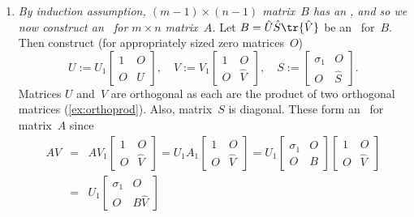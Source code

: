 \begin{enumerate}
\item \emph{By induction assumption, \((m-1)\times(n-1)\) matrix~\(B\) has an \svd, and so we now construct an \svd\ for \(m\times n\) matrix~\(A\).}
Let \(B=\hat U\hat S\tr{\hat V}\) be an \svd\ for~\(B\).
Then construct (for appropriately sized zero matrices~\(O\))
\begin{equation*}
U:=U_1\begin{bmatrix} 1&O\\O&\hat U \end{bmatrix},\quad
V:=V_1\begin{bmatrix} 1&O\\O&\hat V\end{bmatrix},\quad
S:=\begin{bmatrix} \sigma_1&O\\O&\hat S \end{bmatrix}.
\end{equation*}
Matrices \(U\) and~\(V\) are orthogonal as each are the product of two orthogonal matrices (\cref{ex:orthoprod}).
Also, matrix~\(S\) is diagonal.
These form an \svd\ for matrix~\(A\) since
\begin{eqnarray*}
AV&=&AV_1\begin{bmatrix} 1&O\\O&\hat V\end{bmatrix}
=U_1A_1\begin{bmatrix} 1&O\\O&\hat V\end{bmatrix}
=U_1\begin{bmatrix} \sigma_1&O \\O&B \end{bmatrix}\begin{bmatrix} 1&O\\O&\hat V\end{bmatrix}
\\&=&U_1\begin{bmatrix} \sigma_1&O \\O&B\hat V \end{bmatrix}

\end{eqnarray*}
\end{enumerate}
